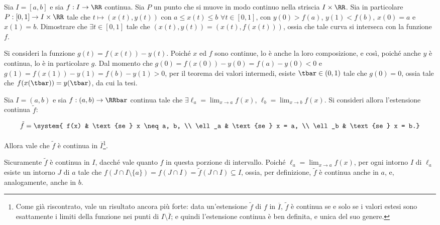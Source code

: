\documentclass[11pt]{article}
\begin{document}
	\begin{exercise}
		Sia $I = [a, b]$ e sia $f: I \to \RR$ continua. Sia $P$ un punto che si muove in modo continuo nella striscia $I \times \RR$. Sia in
		particolare $P : [0, 1] \to I \times \RR$ tale che
		$t \mapsto (x(t), y(t))$ con $a \leq x(t) \leq b$ $\forall t \in [0, 1]$, con $y(0) > f(a)$, $y(1) < f(b)$, $x(0) = a$ e $x(1) = b$. Dimostrare che $\exists t \in
		[0, 1]$ tale che $(x(t), y(t)) = (x(t), f(x(t)))$, ossia che tale
		curva si interseca con la funzione $f$.
	\end{exercise}

	\begin{solution}
		Si consideri la funzione $g(t) = f(x(t)) - y(t)$. Poiché $x$ ed
		$f$ sono continue, lo è anche la loro composizione, e così,
		poiché anche $y$ è continua, lo è in particolare $g$. Dal momento
		che $g(0) = f(x(0)) - y(0) = f(a) - y(0) < 0$ e $g(1) =
		f(x(1)) - y(1) = f(b) - y(1) > 0$, per il teorema dei valori
		intermedi, esiste $\tbar \in (0, 1)$ tale che $g(0) = 0$,
		ossia tale che $f(x(\tbar)) = y(\tbar)$, da cui la tesi.
	\end{solution}
	
	\begin{exercise}
		Sia $I = (a, b)$ e sia $f : (a, b) \to \RRbar$ continua tale che
		$\exists \ell_a = \lim_{x \to a} f(x)$, $\ell_b = \lim_{x \to b} f(x)$.
		Si consideri allora l'estensione continua $\tilde f$:
		
		\[ \tilde f = \system{ f(x) & \text{se } x \neq a, b, \\ \ell_a & \text{se } x = a, \\ \ell_b & \text{se } x = b.} \]
		
		Allora vale che $\tilde f$ è continua in $\overline I$\footnote{Come
			già riscontrato, vale un risultato ancora più forte:
			data un'estensione $\tilde f$ di $f$ in $\overline I$, $\tilde f$
			è continua se e solo se i valori estesi sono esattamente i limiti
			della funzione nei punti di $I \setminus \overline I$; e quindi
			l'estensione continua è ben definita, e unica del suo genere.}.
	\end{exercise}

	\begin{solution}
		Sicuramente $\tilde f$ è continua in $I$, dacché vale quanto
		$f$ in questa porzione di intervallo. Poiché $\ell_a = \lim_{x \to a} f(x)$, per ogni intorno $I$ di $\ell_a$ esiste un intorno $J$ di $a$
		tale che $f(J \cap I \setminus \{a\}) = f(J \cap I) = \tilde f(J \cap I) \subseteq I$, ossia, per definizione, $\tilde f$ è continua
		anche in $a$, e, analogamente, anche in $b$.
	\end{solution}
\end{document}
